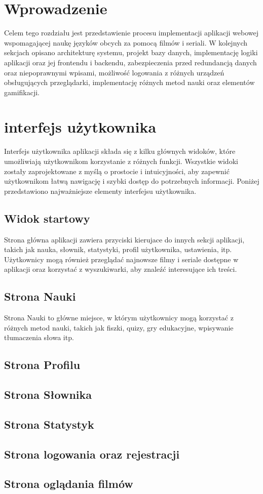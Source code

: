 



\section{Wprowadzenie}
Celem tego rozdziału jest przedstawienie procesu implementacji aplikacji webowej wspomagającej naukę języków obcych za pomocą filmów i seriali. W kolejnych sekcjach opisano architekturę systemu, projekt bazy danych, implementację logiki aplikacji oraz jej frontendu i backendu, zabezpieczenia przed redundancją danych oraz niepoprawnymi wpisami, możliwość logowania z różnych urządzeń obsługujących przeglądarki, implementację różnych metod nauki oraz elementów gamifikacji.
\section{interfejs użytkownika}
Interfejs użytkownika aplikacji składa się z kilku głównych widoków, które umożliwiają użytkownikom korzystanie z różnych funkcji. Wszystkie widoki zostały zaprojektowane z myślą o prostocie i intuicyjności, aby zapewnić użytkownikom łatwą nawigację i szybki dostęp do potrzebnych informacji. Poniżej przedstawiono najważniejsze elementy interfejsu użytkownika.
\subsection{Widok startowy}
Strona główna aplikacji zawiera przyciski kierujace do innych sekcji aplikacji, takich jak nauka, słownik, statystyki, profil użytkownika, ustawienia, itp. Użytkownicy mogą również przeglądać najnowsze filmy i seriale dostępne w aplikacji oraz korzystać z wyszukiwarki, aby znaleźć interesujące ich treści.
\subsection{Strona Nauki}
Strona Nauki to główne miejsce, w którym użytkownicy mogą korzystać z różnych metod nauki, takich jak fiszki, quizy, gry edukacyjne, wpisywanie tłumaczenia słowa itp.
\subsection{Strona Profilu}
\subsection{Strona Słownika}
\subsection{Strona Statystyk}
\subsection{Strona logowania oraz rejestracji}
\subsection{Strona oglądania filmów}




